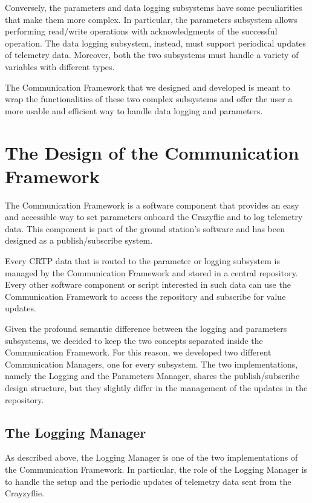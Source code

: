 Conversely, the parameters and data logging subsystems have some peculiarities that make them more complex. 
In particular, the parameters subsystem allows performing read/write operations with acknowledgments of the successful operation.
The data logging subsystem, instead, must support periodical updates of telemetry data.
Moreover, both the two subsystems must handle a variety of variables with different types.

The Communication Framework that we designed and developed is meant to wrap the functionalities of these two complex subsystems and offer the user a more usable and efficient way to handle data logging and parameters.

\section{The Design of the Communication Framework}\label{sec:communication_frameworks_design}

The Communication Framework is a software component that provides an easy and accessible way to set parameters onboard the Crazyflie and to log telemetry data.
This component is part of the ground station's software and has been designed as a publish/subscribe system.

Every CRTP data that is routed to the parameter or logging subsystem is managed by the Communication Framework and stored in a central repository.
Every other software component or script interested in such data can use the Communication Framework to access the repository and subscribe for value updates.

Given the profound semantic difference between the logging and parameters subsystems, we decided to keep the two concepts separated inside the Communication Framework.
For this reason, we developed two different Communication Managers, one for every subsystem. The two implementations, namely the Logging and the Parameters Manager, 
shares the publish/subscribe design structure, but they slightly differ in the management of the updates in the repository.

\subsection{The Logging Manager}\label{subsec:logging_manager}

As described above, the Logging Manager is one of the two implementations of the Communication Framework. 
In particular, the role of the Logging Manager is to handle the setup and the periodic updates of telemetry data sent from the Crayzyflie.


